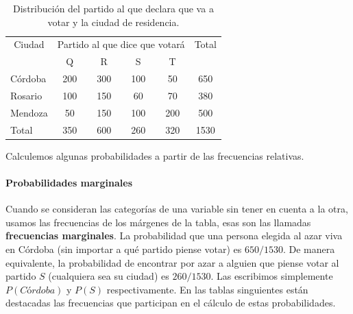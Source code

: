 \documentclass[]{article}
\let\oldparagraph\paragraph
\renewcommand{\paragraph}[1]{\oldparagraph{#1}\mbox{}}
\begin{document}
\begin{table}

\caption{\label{tab:unnamed-chunk-15}Distribución del partido al que declara que va a votar y la ciudad de residencia.}
\centering
\begin{tabular}[t]{lccccc}
\toprule
\multicolumn{1}{c}{Ciudad} & \multicolumn{4}{c}{Partido al que dice que votará} & \multicolumn{1}{c}{Total} \\
\cmidrule(l{3pt}r{3pt}){1-1} \cmidrule(l{3pt}r{3pt}){2-5} \cmidrule(l{3pt}r{3pt}){6-6}
 & Q & R & S & T & \\
\midrule
\rowcolor{gray!6}  Córdoba & 200 & 300 & 100 & 50 & 650\\
Rosario & 100 & 150 & 60 & 70 & 380\\
\rowcolor{gray!6}  Mendoza & 50 & 150 & 100 & 200 & 500\\
Total & 350 & 600 & 260 & 320 & 1530\\
\bottomrule
\end{tabular}
\end{table}

Calculemos algunas probabilidades a partir de las frecuencias relativas.

\hypertarget{probabilidades-marginales}{%
\paragraph{Probabilidades marginales}\label{probabilidades-marginales}}

Cuando se consideran las categorías de una variable sin tener en cuenta
a la otra, usamos las frecuencias de los márgenes de la tabla, esas son
las llamadas \textbf{frecuencias marginales}. La probabilidad que una
persona elegida al azar viva en Córdoba (sin importar a qué partido
piense votar) es \(650/1530\). De manera equivalente, la probabilidad de
encontrar por azar a alguien que piense votar al partido \(S\)
(cualquiera sea su ciudad) es \(260/1530\). Las escribimos simplemente
\(P(Córdoba)\) y \(P(S)\) respectivamente. En las tablas singuientes
están destacadas las frecuencias que participan en el cálculo de estas
probabilidades.
\end{document}
